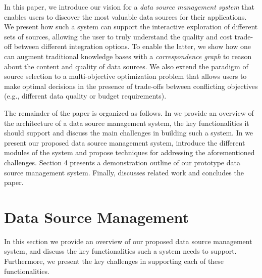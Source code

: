 \documentclass{sig-alternate}
\begin{document}
In this paper, we introduce our vision for a {\em data source management system} that enables users to discover the most valuable data sources for their applications. We present how such a system can support the interactive exploration of different sets of sources, allowing the user to truly understand the quality and cost trade-off between different integration options. To enable the latter, we show how one can augment traditional knowledge bases with a {\em correspondence graph} to reason about the content and quality of data sources. We also extend the paradigm of source selection to a multi-objective optimization problem that allows users to make optimal decisions in the presence of trade-offs between conflicting objectives (e.g., different data quality or budget requirements).

The remainder of the paper is organized as follows. In  we provide an overview of the architecture of a data source management system, the key functionalities it should support and discuss the main challenges in building such a system. In  we present our proposed data source management system, introduce the different modules of the system and propose techniques for addressing the aforementioned challenges. Section 4 presents a demonstration outline of our prototype data source management system. Finally,  discusses related work and  concludes the paper. 

\section{Data Source Management}
\label{sec:overview}
In this section we provide an overview of our proposed data source management system, and discuss the key functionalities such a system needs to support. Furthermore, we present the key challenges in supporting each of these functionalities.
\end{document}
